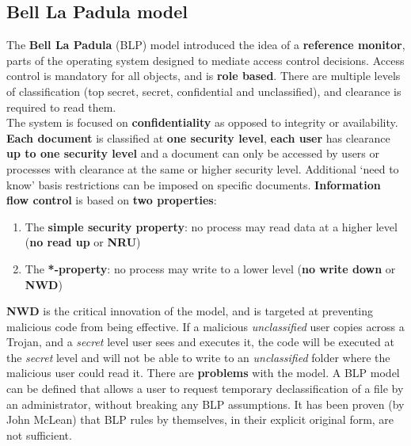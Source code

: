\documentclass{article}
\newcommand{\np}{\vspace{8pt} \\}
\begin{document}
\subsection{Bell La Padula model}
The \textbf{Bell La Padula} (BLP) model introduced the idea of a \textbf{reference monitor}, parts of the operating system designed to mediate access control decisions. Access control is mandatory for all objects, and is \textbf{role based}. There are multiple levels of classification (top secret, secret, confidential and unclassified), and clearance is required to read them. \np
The system is focused on \textbf{confidentiality} as opposed to integrity or availability. \textbf{Each document} is classified at \textbf{one security level}, \textbf{each user} has clearance \textbf{up to one security level} and a document can only be accessed by users or processes with clearance at the same or higher security level. Additional `need to know' basis restrictions can be imposed on specific documents. \textbf{Information flow control} is based on \textbf{two properties}:
\begin{enumerate}
	\item The \textbf{simple security property}: no process may read data at a higher level (\textbf{no read up} or \textbf{NRU})
	\item The \textbf{*-property}: no process may write to a lower level (\textbf{no write down} or \textbf{NWD})
\end{enumerate}
\textbf{NWD} is the critical innovation of the model, and is targeted at preventing malicious code from being effective. If a malicious \textit{unclassified} user copies across a Trojan, and a \textit{secret} level user sees and executes it, the code will be executed at the \textit{secret} level and will not be able to write to an \textit{unclassified} folder where the malicious user could read it. There are \textbf{problems} with the model. A BLP model can be defined that allows a user to request temporary declassification of a file by an administrator, without breaking any BLP assumptions. It has been proven (by John McLean) that BLP rules by themselves, in their explicit original form, are not sufficient.
\end{document}
